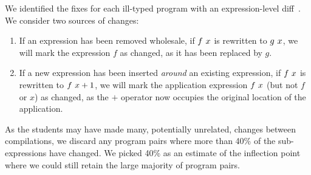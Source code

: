 We identified the fixes for each ill-typed program with an
expression-level diff~\citep{Lempsink2009-xf}.
%
We consider two sources of changes:
%
\begin{enumerate}
\item If an expression has been removed wholesale, \eg if $f\ x$
  is rewritten to $g\ x$, we will mark the expression $f$ as
  changed, as it has been replaced by $g$.
\item If a new expression has been inserted \emph{around} an existing
  expression, \eg if $f\ x$ is rewritten to
  $f\ x + 1$, we will mark the application expression
  $f\ x$ (but not $f$ or $x$) as changed, as the $+$ operator now
  occupies the original location of the application.
\end{enumerate}
%
As the students may have made many, potentially unrelated, changes
between compilations, we discard any program pairs where more than 40\%
of the sub-expressions have changed.
%
We picked 40\% as an estimate of the inflection point where we could
still retain the large majority of program pairs.






